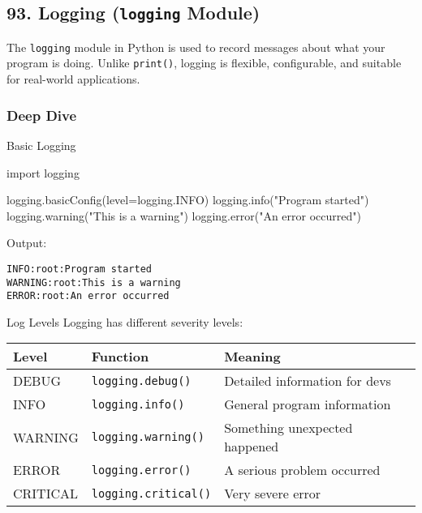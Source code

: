 \documentclass[
  letterpaper,
  DIV=11,
  numbers=noendperiod]{scrreprt}
\newenvironment{Shaded}{\begin{snugshade}}{\end{snugshade}}
\newcommand{\ImportTok}[1]{\textcolor[rgb]{0.00,0.46,0.62}{#1}}
\newcommand{\NormalTok}[1]{\textcolor[rgb]{0.00,0.23,0.31}{#1}}
\newcommand{\OperatorTok}[1]{\textcolor[rgb]{0.37,0.37,0.37}{#1}}
\newcommand{\StringTok}[1]{\textcolor[rgb]{0.13,0.47,0.30}{#1}}
\begin{document}
\subsection{\texorpdfstring{93. Logging (\texttt{logging}
Module)}{93. Logging (logging Module)}}\label{logging-logging-module}

The \texttt{logging} module in Python is used to record messages about
what your program is doing. Unlike \texttt{print()}, logging is
flexible, configurable, and suitable for real-world applications.

\subsubsection{Deep Dive}\label{deep-dive-92}

Basic Logging

\begin{Shaded}
\begin{Highlighting}[]
\ImportTok{import}\NormalTok{ logging}

\NormalTok{logging.basicConfig(level}\OperatorTok{=}\NormalTok{logging.INFO)}
\NormalTok{logging.info(}\StringTok{"Program started"}\NormalTok{)}
\NormalTok{logging.warning(}\StringTok{"This is a warning"}\NormalTok{)}
\NormalTok{logging.error(}\StringTok{"An error occurred"}\NormalTok{)}
\end{Highlighting}
\end{Shaded}

Output:

\begin{verbatim}
INFO:root:Program started
WARNING:root:This is a warning
ERROR:root:An error occurred
\end{verbatim}

Log Levels Logging has different severity levels:

\begin{longtable}[]{@{}lll@{}}
\toprule\noalign{}
Level & Function & Meaning \\
\midrule\noalign{}
\endhead
\bottomrule\noalign{}
\endlastfoot
DEBUG & \texttt{logging.debug()} & Detailed information for devs \\
INFO & \texttt{logging.info()} & General program information \\
WARNING & \texttt{logging.warning()} & Something unexpected happened \\
ERROR & \texttt{logging.error()} & A serious problem occurred \\
CRITICAL & \texttt{logging.critical()} & Very severe error \\
\end{longtable}
\end{document}
